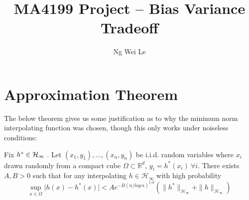 \documentclass[english]{article}
\title{MA4199 Project -- Bias Variance Tradeoff}
\date{}
\author{Ng Wei Le}
\begin{document}
\maketitle
\section{Approximation Theorem} \label{sec:AppThm}
The below theorem gives us some justification as to why the minimum norm interpolating function was chosen, though this only works under noiseless conditions:
\begin{thm} \label{thm:approx}
	Fix $h^* \in \mathcal{H}_\infty $  .
Let $(x_1,y_1), ..., (x_n,y_n)$ be i.i.d. random variables where $x_i$ drawn randomly from a compact cube $\Omega \subset \mathbb{R}^d $,
$y_i = h^*(x_i) \: \forall i$. There exists $A, B > 0$ such that for any interpolating $h \in \mathcal{H}_\infty $ with high probability
\begin{equation*}
\sup_{x \in \Omega} \vert h(x) - h^*(x)\vert < A e^{-B(n/log \, n)^{1/d}} (\| h^* \|_{\mathcal{H}_\infty} + \| h \|_{\mathcal{H}_\infty})
\end{equation*}
\end{thm}
\end{document}
